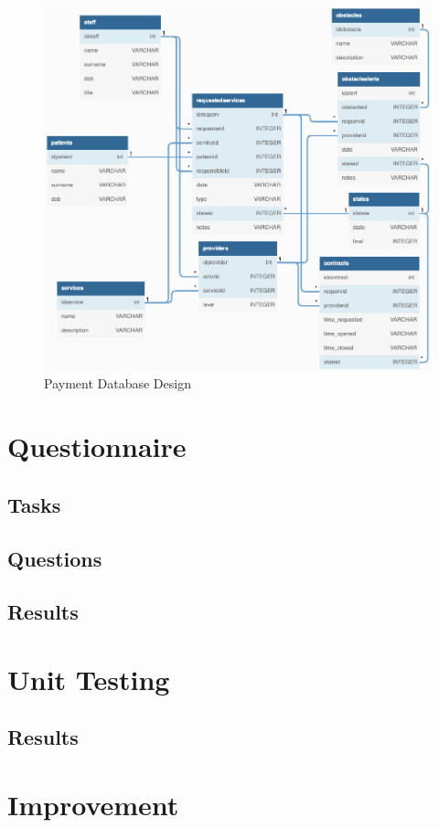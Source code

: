 \begin{figure}[ht]
    \centering
    \includegraphics[width=\textwidth]{overleaf/images/chens_healthcare_db_design.png}
    \caption{Payment Database Design}
    \label{fig:payment_db_design}
\end{figure}

\section{Questionnaire}
\subsection{Tasks}
\subsection{Questions}
\subsection{Results}

\section{Unit Testing}
\subsection{Results}

\section{Improvement}
